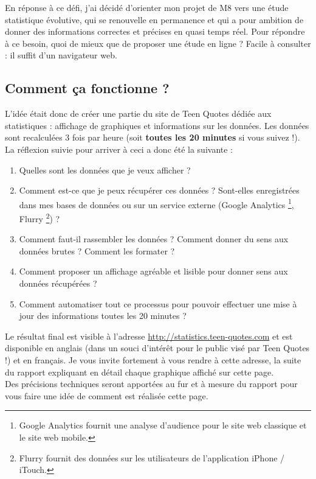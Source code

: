\documentclass{report}
\begin{document}
	En réponse à ce défi, j'ai décidé d'orienter mon projet de M8 vers une étude statistique évolutive, qui se renouvelle en permanence et qui a pour ambition de donner des informations correctes et précises en quasi temps réel. Pour répondre à ce besoin, quoi de mieux que de proposer une étude en ligne ? Facile à consulter : il suffit d'un navigateur web.

	\subsection{Comment ça fonctionne ?}
	L'idée était donc de créer une partie du site de Teen Quotes dédiée aux statistiques : affichage de graphiques et informations sur les données. Les données sont recalculées 3 fois par heure (soit \textbf{toutes les 20 minutes} si vous suivez !). La réflexion suivie pour arriver à ceci a donc été la suivante :
	\vspace{10px}
	\begin{enumerate}
		\item Quelles sont les données que je veux afficher ?
		\item Comment est-ce que je peux récupérer ces données ? Sont-elles enregistrées dans mes bases de données ou sur un service externe (Google Analytics \footnote{Google Analytics fournit une analyse d'audience pour le site web classique et le site web mobile.}, Flurry \footnote{Flurry fournit des données sur les utilisateurs de l'application iPhone / iTouch.}) ?
		\item Comment faut-il rassembler les données ? Comment donner du sens aux données brutes ? Comment les formater ?
		\item Comment proposer un affichage agréable et lisible pour donner sens aux données récupérées ?
		\item Comment automatiser tout ce processus pour pouvoir effectuer une mise à jour des informations toutes les 20 minutes ?
	\end{enumerate}
	\vspace{10px}
	Le résultat final est visible à l'adresse \url{http://statistics.teen-quotes.com} et est disponible en anglais (dans un souci d'intérêt pour le public visé par Teen Quotes !) et en français. Je vous invite fortement à vous rendre à cette adresse, la suite du rapport expliquant en détail chaque graphique affiché sur cette page.\\

	Des précisions techniques seront apportées au fur et à mesure du rapport pour vous faire une idée de comment est réalisée cette page.
\end{document}
